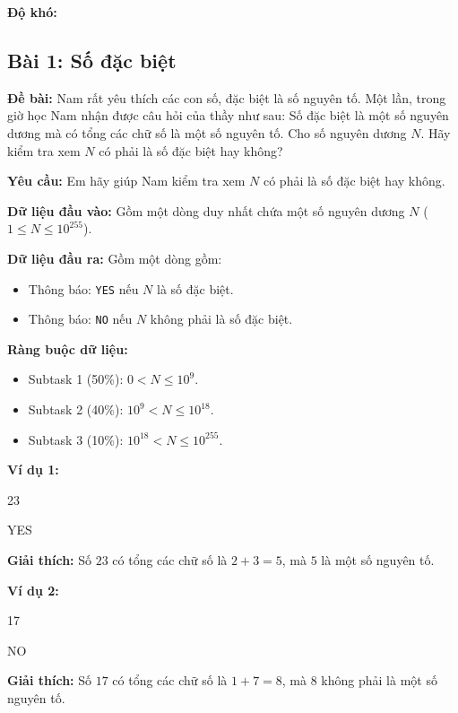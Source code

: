 \documentclass[12pt]{scrartcl}  %
\begin{document}
\textbf{Độ khó: }
\subsection{Bài 1: Số đặc biệt}
\textbf{Đề bài:}
Nam rất yêu thích các con số, đặc biệt là số nguyên tố. Một lần, trong giờ học Nam nhận được câu hỏi của thầy như sau: Số đặc biệt là một số nguyên dương mà có 
tổng các chữ số là một số nguyên tố. Cho số nguyên dương $N$. Hãy kiểm tra xem $N$ có phải là số đặc biệt hay không? 

\textbf{Yêu cầu:}
Em hãy giúp Nam kiểm tra xem $N$ có phải là số đặc biệt hay không.

\textbf{Dữ liệu đầu vào:}
Gồm một dòng duy nhất chứa một số nguyên dương $N$ ($1 \leq N \leq 10^{255}$).

\textbf{Dữ liệu đầu ra:}
Gồm một dòng gồm:
\begin{itemize}
    \item Thông báo: \texttt{YES} nếu $N$ là số đặc biệt.
    \item Thông báo: \texttt{NO} nếu $N$ không phải là số đặc biệt.
\end{itemize}

\textbf{Ràng buộc dữ liệu:}
\begin{itemize}
    \item Subtask 1 (50\%): $0 < N \leq 10^9$.
    \item Subtask 2 (40\%): $10^9 < N \leq 10^{18}$.
    \item Subtask 3 (10\%): $10^{18} < N \leq 10^{255}$.
\end{itemize}

\textbf{Ví dụ 1:}
\begin{tcolorbox}[colback=gray!5!white, colframe=blue!50!black, title=Input]
23
\end{tcolorbox}
\begin{tcolorbox}[colback=gray!5!white, colframe=green!50!black, title=Output]
YES
\end{tcolorbox}

\textbf{Giải thích:}
Số $23$ có tổng các chữ số là $2 + 3 = 5$, mà $5$ là một số nguyên tố.

\textbf{Ví dụ 2:}
\begin{tcolorbox}[colback=gray!5!white, colframe=blue!50!black, title=Input]
17
\end{tcolorbox}
\begin{tcolorbox}[colback=gray!5!white, colframe=green!50!black, title=Output]
NO
\end{tcolorbox}
\textbf{Giải thích:}
Số $17$ có tổng các chữ số là $1 + 7 = 8$, mà $8$ không phải là một số nguyên tố.
\end{document}
